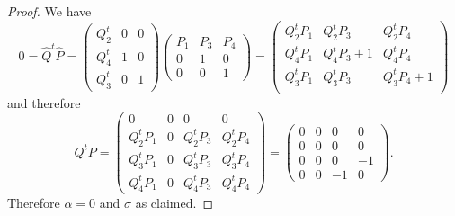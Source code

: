 \documentclass[11pt]{amsart}
\theoremstyle{plain}
\numberwithin{equation}{section}
\theoremstyle{definition}
\theoremstyle{remark}
\begin{document}
\begin{proof}
We have
\[ 
0= \widehat{Q}^t\widehat{P}
=
\begin{pmatrix}
	Q_2^t & 0& 0 \\
	Q_4^t& 1 & 0 \\
	Q_3^t & 0 & 1
\end{pmatrix}
\begin{pmatrix}
	P_1 & P_3 & P_4 \\
	0&  1& 0 \\
	0 & 0 & 1
\end{pmatrix}
= 
\begin{pmatrix}
	Q_2^tP_1 & Q_2^tP_3 & Q_2^tP_4 \\
	Q_4^tP_1 & Q_4^tP_3+1 & Q_4^tP_4 \\
	Q_3^tP_1 & Q_3^tP_3 & Q_3^tP_4+1 \\
\end{pmatrix}
\]
and therefore 
\[
Q^tP = \begin{pmatrix}
 0 & 0 & 0 & 0 \\
 Q^t_2P_1 & 0 & Q_2^t P_3 & Q_2^t P_4 \\
  Q^t_3P_1 & 0 & Q_3^t P_3 & Q_3^t P_4 \\
   Q^t_4P_1 & 0 & Q_4^t P_3 & Q_4^t P_4 
\end{pmatrix} =
\begin{pmatrix}
0 & 0 & 0 & 0\\
0 & 0 & 0 & 0\\
0 & 0 & 0 & -1\\
0 & 0 & -1 & 0
\end{pmatrix}.
\]
Therefore $\alpha=0$ and $\sigma$ as claimed. 
\end{proof}
\end{document}

